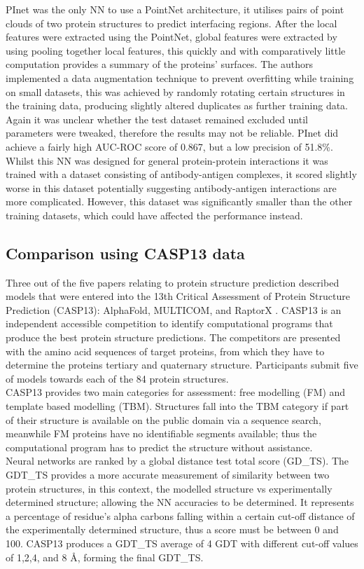 PInet was the only NN to use a PointNet architecture, it utilises pairs of point clouds of two protein structures to predict interfacing regions. After the local features were extracted using the PointNet, global features were extracted by using pooling together local features, this quickly and with comparatively little computation provides a summary of the proteins' surfaces. The authors implemented a data augmentation technique to prevent overfitting while training on small datasets, this was achieved by randomly rotating certain structures in the training data, producing slightly altered duplicates as further training data. Again it was unclear whether the test dataset remained excluded until parameters were tweaked, therefore the results may not be reliable. PInet did achieve a fairly high AUC-ROC score of 0.867, but a low precision of 51.8\%. Whilst this NN was designed for general protein-protein interactions it was trained with a dataset consisting of antibody-antigen complexes, it scored slightly worse in this dataset potentially suggesting antibody-antigen interactions are more complicated. However, this dataset was significantly smaller than the other training datasets, which could have affected the performance instead.

\subsection{Comparison using CASP13 data}

Three out of the five papers relating to protein structure prediction described models that were entered into the 13th Critical Assessment of Protein Structure Prediction (CASP13): AlphaFold, MULTICOM, and RaptorX \cite{seniorProteinStructurePrediction2019,houMULTICOMProteinStructure2020a,xuAnalysisDistancebasedProtein2019}. CASP13 is an independent accessible competition to identify computational programs that produce the best protein structure predictions. The competitors are presented with the amino acid sequences of target proteins, from which they have to determine the proteins tertiary and quaternary structure. Participants submit five of models towards each of the 84 protein structures.
\\[12pt]
CASP13 provides two main categories for assessment: free modelling (FM) and template based modelling (TBM). Structures fall into the TBM category if part of their structure is available on the public domain via a sequence search, meanwhile FM proteins have no identifiable segments available; thus the computational program has to predict the structure without assistance. 
\\[12pt]
Neural networks are ranked by a global distance test total score (GD\_TS). The GDT\_TS provides a more accurate measurement of similarity between two protein structures, in this context, the modelled structure vs experimentally determined structure; allowing the NN accuracies to be determined. It represents a percentage of residue's alpha carbons falling within a certain cut-off distance of the experimentally determined structure, thus a score must be between 0 and 100. CASP13 produces a GDT\_TS average of 4 GDT with different cut-off values of 1,2,4, and 8 Å, forming the final GDT\_TS.

